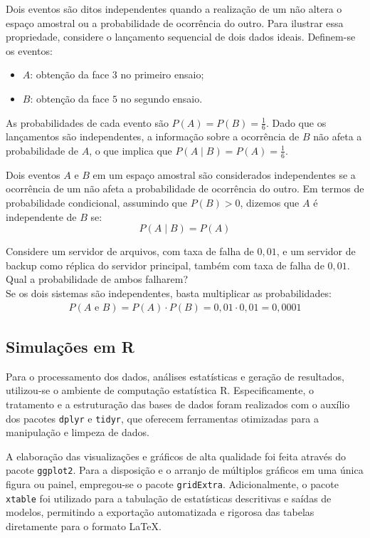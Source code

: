 Dois eventos são ditos independentes quando a realização de um não altera o espaço amostral ou a probabilidade de ocorrência do outro. Para ilustrar essa propriedade, considere o lançamento sequencial de dois dados ideais. Definem-se os eventos:
\begin{itemize}
	\item[] $A$: obtenção da face $3$ no primeiro ensaio;
	\item[] $B$: obtenção da face $5$ no segundo ensaio.
\end{itemize}
As probabilidades de cada evento são $P(A) = P(B) = \frac{1}{6}$. Dado que os lançamentos são independentes, a informação sobre a ocorrência de $B$ não afeta a probabilidade de $A$, o que implica que $P(A \mid B) = P(A) = \frac{1}{6}$.


\begin{definicao}
	Dois eventos $A$ e $B$ em um espaço amostral são considerados independentes se a ocorrência de um não afeta a probabilidade de ocorrência do outro. Em termos de probabilidade condicional, assumindo que $P(B) > 0$, dizemos que $A$ é independente de $B$ se:
	$$P(A \mid B) = P(A)$$

\end{definicao}


\begin{exemplo}
Considere um servidor de arquivos, com taxa de falha de $0,01$, e um servidor de backup como réplica do servidor principal, também com taxa de falha de $0,01$. Qual a probabilidade de ambos falharem?\\
Se os dois sistemas são independentes, basta multiplicar as probabilidades:
\begin{align*}
	P(A \text{ e } B) = P(A) \cdot P(B) = 0,01 \cdot 0,01 = 0,0001
\end{align*}
\end{exemplo}


\subsection{Simulações em R}


Para o processamento dos dados, análises estatísticas e geração de resultados, utilizou-se o ambiente de computação estatística R. Especificamente, o tratamento e a estruturação das bases de dados foram realizados com o auxílio dos pacotes \texttt{dplyr} e \texttt{tidyr}, que oferecem ferramentas otimizadas para a manipulação e limpeza de dados. 

A elaboração das visualizações e gráficos de alta qualidade foi feita através do pacote \texttt{ggplot2}. Para a disposição e o arranjo de múltiplos gráficos em uma única figura ou painel, empregou-se o pacote \texttt{gridExtra}. Adicionalmente, o pacote \texttt{xtable} foi utilizado para a tabulação de estatísticas descritivas e saídas de modelos, permitindo a exportação automatizada e rigorosa das tabelas diretamente para o formato \LaTeX.

